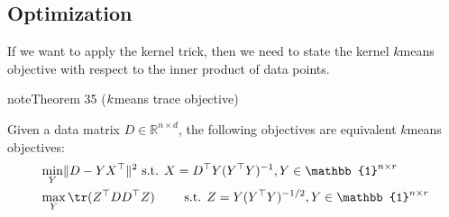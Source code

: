 \documentclass[letterpaper,10pt,english]{jupyterBook}
\begin{document}
\subsection{Optimization}
\label{\detokenize{clustering_kernel_kmeans:optimization}}
\sphinxAtStartPar
If we want to apply the kernel trick, then we need to state the kernel \(k\)\sphinxhyphen{}means objective with respect to the inner product of data points.
\label{clustering_kernel_kmeans:theorem-0}
\begin{sphinxadmonition}{note}{Theorem 35 (\protect\(k\protect\)\sphinxhyphen{}means trace objective)}



\sphinxAtStartPar
Given a data matrix \(D\in\mathbb{R}^{n\times d}\),
the following objectives are equivalent \(k\)\sphinxhyphen{}means objectives:
\label{equation:clustering_kernel_kmeans:a2df6b6f-6192-4102-94bf-19b649da8aeb}\begin{align}
&\min_{Y} \lVert D-YX^\top\rVert^2 \text{  s.t. } X= D^\top Y(Y^\top Y)^{-1}, Y\in\mathbb{1}^{n\times r} \label{eq:km}\\
&\max_{Y} \tr(Z^\top DD^\top Z)\qquad\text{ s.t. } Z= Y(Y^\top Y)^{-1/2}, Y\in\mathbb{1}^{n\times r} \label{eq:kmeansTr}
\end{align}\end{sphinxadmonition}
\end{document}
